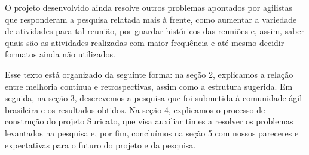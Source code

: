 O projeto desenvolvido ainda resolve outros problemas apontados por agilistas que responderam a pesquisa relatada mais à frente, como aumentar a variedade de atividades para tal reunião, por guardar históricos das reuniões e, assim, saber quais são as atividades realizadas com maior frequência e até mesmo decidir formatos ainda não utilizados.

Esse texto está organizado da seguinte forma: na seção 2, explicamos a relação entre melhoria contínua e retrospectivas, assim como a estrutura sugerida. Em seguida, na seção 3, descrevemos a pesquisa que foi submetida à comunidade ágil brasileira e os resultados obtidos. Na seção 4, explicamos o processo de construção do projeto Suricato, que visa auxiliar times a resolver os problemas levantados na pesquisa e, por fim, concluímos na seção 5 com nossos pareceres e expectativas para o futuro do projeto e da pesquisa.